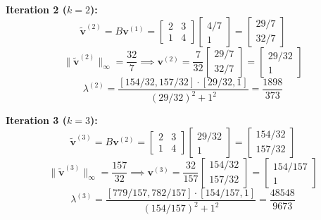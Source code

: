 \documentclass{article}
\newcommand{\0}{{\mathbf{0}}} %
\begin{document}
\textbf{Iteration 2 ($k=2$):}
\[
\tilde{\mathbf{v}}^{(2)} = B \mathbf{v}^{(1)} =
\begin{bmatrix} 2 & 3 \\ 1 & 4
\end{bmatrix}
\begin{bmatrix} 4/7 \\ 1
\end{bmatrix} =
\begin{bmatrix} 29/7 \\ 32/7
\end{bmatrix}
\]
\[
\|\tilde{\mathbf{v}}^{(2)}\|_\infty = \frac{32}{7} \implies \mathbf{v}^{(2)} = \frac{7}{32}
\begin{bmatrix} 29/7 \\ 32/7
\end{bmatrix} =
\begin{bmatrix} 29/32 \\ 1
\end{bmatrix}
\]
\[
\lambda^{(2)} = \frac{[154/32, 157/32] \cdot [29/32, 1]}{(29/32)^2 + 1^2} = \frac{1898}{373}
\]

\textbf{Iteration 3 ($k=3$):}
\[
\tilde{\mathbf{v}}^{(3)} = B \mathbf{v}^{(2)} =
\begin{bmatrix} 2 & 3 \\ 1 & 4
\end{bmatrix}
\begin{bmatrix} 29/32 \\ 1
\end{bmatrix} =
\begin{bmatrix} 154/32 \\ 157/32
\end{bmatrix}
\]
\[
\|\tilde{\mathbf{v}}^{(3)}\|_\infty = \frac{157}{32} \implies \mathbf{v}^{(3)} = \frac{32}{157}
\begin{bmatrix} 154/32 \\ 157/32
\end{bmatrix} =
\begin{bmatrix} 154/157 \\ 1
\end{bmatrix}
\]
\[
\lambda^{(3)} = \frac{[779/157, 782/157] \cdot [154/157, 1]}{(154/157)^2 + 1^2} = \frac{48548}{9673}
\]
\end{document}
